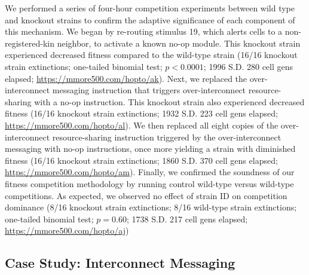 We performed a series of four-hour competition experiments between wild type and knockout strains to confirm the adaptive significance of each component of this mechanism.
We began by re-routing stimulus 19, which alerts cells to a non-registered-kin  neighbor, to activate a known no-op module.
This knockout strain experienced decreased fitness compared to the wild-type strain (16/16 knockout strain extinctions; one-tailed binomial test; $p < 0.0001$; 1996 S.D. 280 cell gens elapsed; \url{https://mmore500.com/hopto/ak}).
Next, we replaced the over-interconnect messaging instruction that triggers over-interconnect resource-sharing with a no-op instruction.
This knockout strain also experienced decreased fitness (16/16 knockout strain extinctions; 1932 S.D. 223 cell gens elapsed; \url{https://mmore500.com/hopto/al}).
We then replaced all eight copies of the over-interconnect resource-sharing instruction triggered by the over-interconnect messaging with no-op instructions, once more yielding a strain with diminished fitness (16/16 knockout strain extinctions; 1860 S.D. 370 cell gens elapsed; \url{https://mmore500.com/hopto/am}).
Finally, we confirmed the soundness of our fitness competition methodology by running control wild-type versus wild-type competitions.
As expected, we observed no effect of strain ID on competition dominance (8/16 knockout strain extinctions; 8/16 wild-type strain extinctions; one-tailed binomial test; $p = 0.60$; 1738 S.D. 217 cell gens elapsed; \url{https://mmore500.com/hopto/aj})


\subsection{Case Study: Interconnect Messaging}



